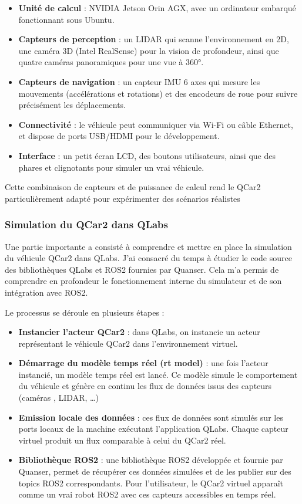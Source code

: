 \documentclass{name}
\begin{document}
\begin{itemize}
    \item \textbf{Unité de calcul} : NVIDIA Jetson Orin AGX, avec un ordinateur embarqué fonctionnant sous Ubuntu.
    \item \textbf{Capteurs de perception} : un LIDAR qui scanne l'environnement en 2D, une caméra 3D (Intel RealSense) pour la vision de profondeur, ainsi que quatre caméras panoramiques pour une vue à 360°.
    \item \textbf{Capteurs de navigation} : un capteur IMU 6 axes qui mesure les mouvements (accélérations et rotations) et des encodeurs de roue pour suivre précisément les déplacements.
    \item \textbf{Connectivité} : le véhicule peut communiquer via Wi-Fi ou câble Ethernet, et dispose de ports USB/HDMI pour le développement.
    \item \textbf{Interface} : un petit écran LCD, des boutons utilisateurs, ainsi que des phares et clignotants pour simuler un vrai véhicule.
\end{itemize}

Cette combinaison de capteurs et de puissance de calcul rend le QCar2 particulièrement adapté pour expérimenter des scénarios réalistes

\subsubsection*{Simulation du QCar2 dans QLabs}

Une partie importante a consisté à comprendre et mettre en place la simulation du véhicule QCar2 dans QLabs. J'ai consacré du temps à étudier le code source des bibliothèques QLabs et ROS2 fournies par Quanser. Cela m'a permis de comprendre en profondeur le fonctionnement interne du simulateur et de son intégration avec ROS2.

Le processus se déroule en plusieurs étapes : 

\begin{itemize}
  \item \textbf{Instancier l'acteur QCar2} : dans QLabs, on instancie un acteur représentant le véhicule QCar2 dans l'environnement virtuel.
  \item \textbf{Démarrage du modèle temps réel (rt model)} : une fois l'acteur instancié, un modèle temps réel est lancé. Ce modèle simule le comportement du véhicule et génère en continu les flux de données issus des capteurs (caméras , LIDAR, …)
  \item \textbf{Emission locale des données} : ces flux de données sont simulés sur les ports locaux de la machine exécutant l'application QLabs. Chaque capteur virtuel produit un flux comparable à celui du QCar2 réel.
  \item \textbf{Bibliothèque ROS2} : une bibliothèque ROS2 développée et fournie par Quanser, permet de récupérer ces données simulées et de les publier sur des topics ROS2 correspondants. Pour l'utilisateur, le QCar2 virtuel apparaît comme un vrai robot ROS2 avec ces capteurs accessibles en temps réel.
\end{itemize}
\end{document}
